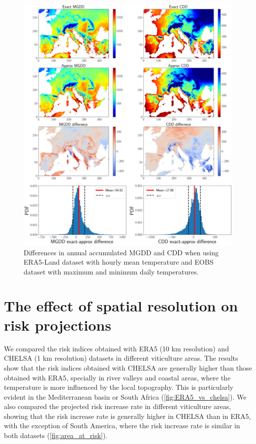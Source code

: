 \begin{figure}[H]
    \centering
    \includegraphics[width=\textwidth]{Figures/E-OBS_vs_ERA5.pdf}
    \caption{Differences in annual accumulated MGDD and CDD when using
        ERA5-Land dataset with hourly mean temperature and EOBS dataset with
        maximum
        and minimum daily temperatures.}
    \label{fig:EOBS_vs_ERA5}
\end{figure}

\newpage
\section{The effect of spatial resolution on risk projections}

We compared the risk indices obtained with ERA5 (10 km resolution) and CHELSA
(1 km resolution) datasets in different viticulture areas. The results show
that the risk indices obtained with CHELSA are generally higher than those
obtained with ERA5, specially in river valleys and coastal areas, where the
temperature is more influenced by the local topography. This is particularly
evident in the Mediterranean basin or South Africa (\cref{fig:ERA5_vs_chelsa}).
We also compared the projected risk increase rate in different viticulture
areas, showing that the risk increase rate is generally higher in CHELSA than
in ERA5, with the exception of South America, where the risk increase rate is
similar in both datasets (\cref{fig:area_at_risk}).

